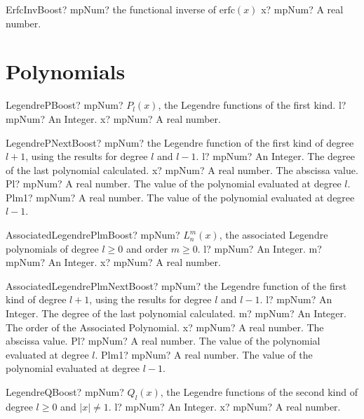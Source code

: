 \documentclass[12pt,a4paper,openany]{book}
\begin{document}
\begin{mpFunctionsExtract}
\mpFunctionOne
{ErfcInvBoost? mpNum? the functional inverse of $\text{erfc}(x)$}
{x? mpNum? A real number.}
\end{mpFunctionsExtract}

\section{Polynomials}

\begin{mpFunctionsExtract}
\mpFunctionTwo
{LegendrePBoost? mpNum? $P_l(x)$, the Legendre functions of the first kind.}
{l? mpNum? An Integer.}
{x? mpNum? A real number.}
\end{mpFunctionsExtract}

\begin{mpFunctionsExtract}
\mpFunctionFour
{LegendrePNextBoost? mpNum? the Legendre function of the first kind of degree $l+1$, using the results for degree $l$ and $l-1$.}
{l? mpNum? An Integer. The degree of the last polynomial calculated.}
{x? mpNum? A real number. The abscissa value.}
{Pl? mpNum? A real number. The value of the polynomial evaluated at degree $l$.}
{Plm1? mpNum? A real number. The value of the polynomial evaluated at degree $l-1$.}
\end{mpFunctionsExtract}

\begin{mpFunctionsExtract}
\mpFunctionThree
{AssociatedLegendrePlmBoost? mpNum? $L^m_n (x)$, the associated Legendre polynomials of degree $l \geq 0$ and order $m \geq 0$.}
{l? mpNum? An Integer.}
{m? mpNum? An Integer.}
{x? mpNum? A real number.}
\end{mpFunctionsExtract}

\begin{mpFunctionsExtract}
\mpFunctionFive
{AssociatedLegendrePlmNextBoost? mpNum? the Legendre function of the first kind of degree $l+1$, using the results for degree $l$ and $l-1$.}
{l? mpNum? An Integer. The degree of the last polynomial calculated.}
{m? mpNum? An Integer. The order of the Associated Polynomial.}
{x? mpNum? A real number. The abscissa value.}
{Pl? mpNum? A real number. The value of the polynomial evaluated at degree $l$.}
{Plm1? mpNum? A real number. The value of the polynomial evaluated at degree $l-1$.}
\end{mpFunctionsExtract}

\begin{mpFunctionsExtract}
\mpFunctionTwo
{LegendreQBoost? mpNum? $Q_l(x)$, the Legendre functions of the second kind of degree $l \geq 0$ and $|x| \neq 1$.}
{l? mpNum? An Integer.}
{x? mpNum? A real number.}
\end{mpFunctionsExtract}
\end{document}
